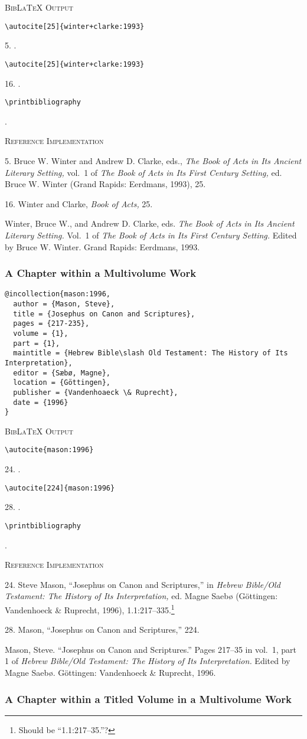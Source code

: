 \documentclass[a4paper]{article}
\newcommand\citetest[5]{%
  {\textsc{BibLaTeX Output}\par
   \nobreak
   \texttt{\textbackslash autocite[#2]\{#5\}}\par
   \color{biblatex-colour}
   #1. \cite[#2]{#5}.\par
   \color{black}
   \texttt{\textbackslash autocite[#4]\{#5\}}\par
   \color{biblatex-colour}
   #3. \cite[#4]{#5}.\par
   \color{black}
   \texttt{\textbackslash printbibliography}\par
   \color{biblatex-colour}
   \hangindent\bibindent\bibentrycite{#5}.\par}}
\newcommand\citetestnpf[4]{%
  {\textsc{BibLaTeX Output}\par
   \nobreak
   \texttt{\textbackslash autocite\{#4\}}\par
   \color{biblatex-colour}
   #1. \cite{#4}.\par
   \color{black}
   \texttt{\textbackslash autocite[#3]\{#4\}}\par
   \color{biblatex-colour}
   #2. \cite[#3]{#4}.\par
   \color{black}
   \texttt{\textbackslash printbibliography}\par
   \color{biblatex-colour}
   \hangindent\bibindent\bibentrycite{#4}.\par}}
\newenvironment{refimp}{%
  \begin{minipage}{\linewidth}
    \setlength{\parskip}{1ex}
    \textsc{Reference Implementation}\par
    \nobreak
    \color{reference-colour}
}{\end{minipage}}
\begin{document}
\citetest{5}{25}{16}{25}{winter+clarke:1993}

\begin{refimp}
  5. Bruce W. Winter and Andrew D. Clarke, eds., \emph{The Book of Acts in Its
  Ancient Literary Setting,} vol.~1 of \emph{The Book of Acts in Its First
  Century Setting,} ed. Bruce W. Winter (Grand Rapids: Eerdmans, 1993), 25.

  16. Winter and Clarke, \emph{Book of Acts,} 25.

  \hangindent\bibindent Winter, Bruce W., and Andrew D. Clarke, eds. \emph{The
  Book of Acts in Its Ancient Literary Setting.} Vol.~1 of \emph{The Book of
  Acts in Its First Century Setting.} Edited by Bruce W. Winter. Grand Rapids:
  Eerdmans, 1993.
\end{refimp}

\subsubsection{A Chapter within a Multivolume Work}

\begin{lstlisting}
@incollection{mason:1996,
  author = {Mason, Steve},
  title = {Josephus on Canon and Scriptures},
  pages = {217-235},
  volume = {1},
  part = {1},
  maintitle = {Hebrew Bible\slash Old Testament: The History of Its Interpretation},
  editor = {Sæbø, Magne},
  location = {Göttingen},
  publisher = {Vandenhoaeck \& Ruprecht},
  date = {1996}
}
\end{lstlisting}

\citetestnpf{24}{28}{224}{mason:1996}

\begin{refimp}
  24. Steve Mason, “Josephus on Canon and Scriptures,” in \emph{Hebrew
  Bible\slash Old Testament: The History of Its Interpretation,} ed. Magne
  Saebø (Göttingen: Vandenhoeck \& Ruprecht, 1996),
  1.1:217–335.\footnote{Should be “1.1:217–35.”?}

  28. Mason, “Josephus on Canon and Scriptures,” 224.

  \hangindent\bibindent Mason, Steve. “Josephus on Canon and Scriptures.”
  Pages 217–35 in vol.~1, part 1 of \emph{Hebrew Bible\slash Old Testament:
  The History of Its Interpretation.} Edited by Magne Saebø. Göttingen:
  Vandenhoeck \& Ruprecht, 1996.
\end{refimp}

\subsubsection{A Chapter within a Titled Volume in a Multivolume Work}
\end{document}
